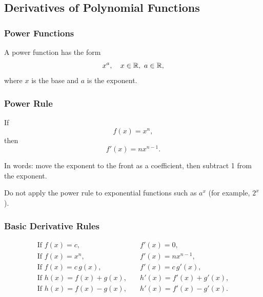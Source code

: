 \subsection{Derivatives of Polynomial Functions}

\subsubsection{Power Functions}
A power function has the form
\[
  x^a, \quad x\in\mathbb{R},\ a\in\mathbb{R},
\]
where $x$ is the base and $a$ is the exponent.

\subsubsection{Power Rule}
If
\[
  f(x)=x^n,
\]
then
\[
  f'(x)=nx^{n-1}.
\]

In words: move the exponent to the front as a coefficient, then subtract 1 from the exponent.

\begin{remark}
Do not apply the power rule to exponential functions such as $a^x$ (for example, $2^x$).
\end{remark}

\subsubsection{Basic Derivative Rules}
\begin{align*}
\text{If } f(x)=c, &\quad f'(x)=0, \\
\text{If } f(x)=x^n, &\quad f'(x)=nx^{n-1}, \\
\text{If } f(x)=c\,g(x), &\quad f'(x)=c\,g'(x), \\
\text{If } h(x)=f(x)+g(x), &\quad h'(x)=f'(x)+g'(x), \\
\text{If } h(x)=f(x)-g(x), &\quad h'(x)=f'(x)-g'(x).
\end{align*}
